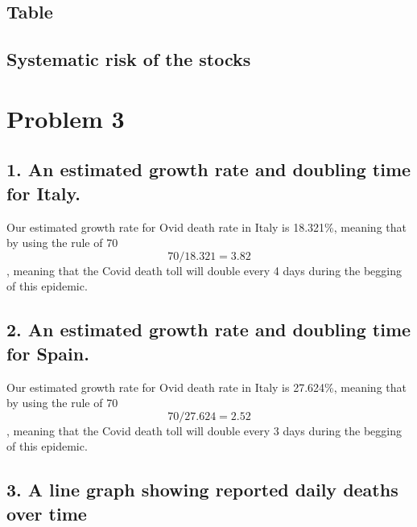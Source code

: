 \documentclass[
]{article}
\begin{document}
\hypertarget{table}{%
\subsection{Table}\label{table}}

\hypertarget{systematic-risk-of-the-stocks}{%
\subsection{Systematic risk of the
stocks}\label{systematic-risk-of-the-stocks}}

\hypertarget{problem-3}{%
\section{Problem 3}\label{problem-3}}

\hypertarget{an-estimated-growth-rate-and-doubling-time-for-italy.}{%
\subsection{1. An estimated growth rate and doubling time for
Italy.}\label{an-estimated-growth-rate-and-doubling-time-for-italy.}}

Our estimated growth rate for Ovid death rate in Italy is 18.321\%,
meaning that by using the rule of 70 \[ 70/18.321 = 3.82\], meaning that
the Covid death toll will double every 4 days during the begging of this
epidemic.

\hypertarget{an-estimated-growth-rate-and-doubling-time-for-spain.}{%
\subsection{2. An estimated growth rate and doubling time for
Spain.}\label{an-estimated-growth-rate-and-doubling-time-for-spain.}}

Our estimated growth rate for Ovid death rate in Italy is 27.624\%,
meaning that by using the rule of 70 \[ 70/27.624 = 2.52\], meaning that
the Covid death toll will double every 3 days during the begging of this
epidemic.

\hypertarget{a-line-graph-showing-reported-daily-deaths-over-time}{%
\subsection{3. A line graph showing reported daily deaths over
time}\label{a-line-graph-showing-reported-daily-deaths-over-time}}
\end{document}

